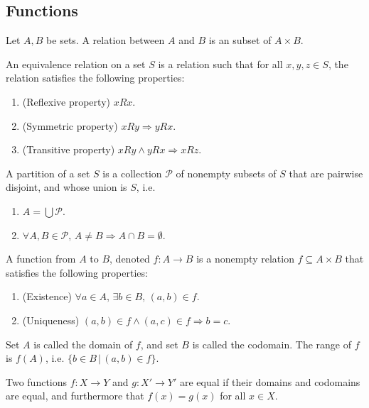 \documentclass{article}
\begin{document}
\subsection{Functions}
\begin{definition}[Relation]
	Let \(A,B\)	be sets. A relation between \(A\) and \(B\) is an subset of \(A\times B\).
\end{definition}
\begin{definition}
	An equivalence relation on a set \(S\) is a relation such that for all \(x,y,z\in S\), the relation satisfies the following properties:
	\begin{enumerate}
		\item (Reflexive property) \(xRx\).
		\item (Symmetric property) \(xRy\Rightarrow yRx\).
		\item (Transitive property) \(xRy\wedge yRx\Rightarrow xRz\).
	\end{enumerate}
\end{definition}
\begin{definition}[Partition]
	A partition of a set \(S\) is a collection \(\mathscr{P}\) of nonempty subsets of \(S\) that are pairwise disjoint, and whose union is \(S\), i.e.
	\begin{enumerate}
		\item \(A=\bigcup\mathscr{P}\).
		\item \(\forall A,B\in\mathscr{P},\,A\neq B\Rightarrow A\cap B=\emptyset\).
	\end{enumerate}
\end{definition}
\begin{definition}[Function]
	A function from \(A\) to \(B\), denoted \(f:A\rightarrow B\) is a nonempty relation \(f\subseteq A\times B\) that satisfies the following properties:
	\begin{enumerate}
		\item (Existence) \(\forall a\in A,\,\exists b\in B,\,(a,b)\in f\).
		\item (Uniqueness) \((a,b)\in f\wedge(a,c)\in f\Rightarrow b=c\).
	\end{enumerate}
	Set \(A\) is called the domain of \(f\), and set \(B\) is called the codomain. The range of \(f\) is \(f(A)\), i.e. \(\{b\in B\,|\,(a,b)\in f\}\).
\end{definition}
\begin{definition}
	Two functions \(f:X\rightarrow Y\) and \(g:X'\rightarrow Y'\) are equal if their domains and codomains are equal, and furthermore that \(f(x)=g(x)\) for all \(x\in X\).
\end{definition}
\end{document}
